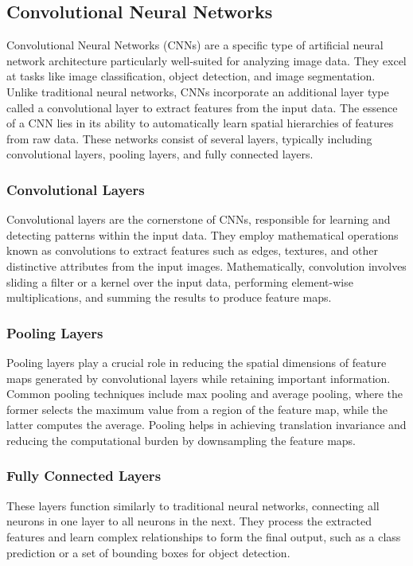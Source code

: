 \documentclass{article}
\begin{document}
\subsection{Convolutional Neural Networks}
Convolutional Neural Networks (CNNs) are a specific type of artificial neural network architecture particularly well-suited for analyzing image data. They excel at tasks like image classification, object detection, and image segmentation. Unlike traditional neural networks, CNNs incorporate an additional layer type called a convolutional layer to extract features from the input data. The essence of a CNN lies in its ability to automatically learn spatial hierarchies of features from raw data. These networks consist of several layers, typically including convolutional layers, pooling layers, and fully connected layers.

\subsubsection{Convolutional Layers}
Convolutional layers are the cornerstone of CNNs, responsible for learning and detecting patterns within the input data. They employ mathematical operations known as convolutions to extract features such as edges, textures, and other distinctive attributes from the input images. Mathematically, convolution involves sliding a filter or a kernel over the input data, performing element-wise multiplications, and summing the results to produce feature maps.

\subsubsection{Pooling Layers}
Pooling layers play a crucial role in reducing the spatial dimensions of feature maps generated by convolutional layers while retaining important information. Common pooling techniques include max pooling and average pooling, where the former selects the maximum value from a region of the feature map, while the latter computes the average. Pooling helps in achieving translation invariance and reducing the computational burden by downsampling the feature maps.

\subsubsection{Fully Connected Layers}
These layers function similarly to traditional neural networks, connecting all neurons in one layer to all neurons in the next. They process the extracted features and learn complex relationships to form the final output, such as a class prediction or a set of bounding boxes for object detection.
\end{document}
